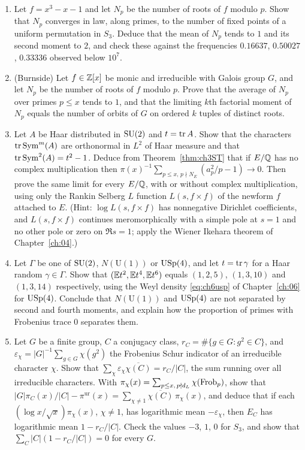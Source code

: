 \begin{enumerate}
\item Let $f=x^3-x-1$ and let $N_p$ be the number of roots of $f$ modulo $p$. Show that $N_p$ converges in law, along primes, to the number of fixed points of a uniform permutation in $S_3$. Deduce that the mean of $N_p$ tends to $1$ and its second moment to $2$, and check these against the frequencies $0.16637$, $0.50027$, $0.33336$ observed below $10^7$.
\item (Burnside) Let $f\in\mathbb{Z}[x]$ be monic and irreducible with Galois group $G$, and let $N_p$ be the number of roots of $f$ modulo $p$. Prove that the average of $N_p$ over primes $p\le x$ tends to $1$, and that the limiting $k$th factorial moment of $N_p$ equals the number of orbits of $G$ on ordered $k$ tuples of distinct roots.
\item Let $A$ be Haar distributed in $\mathrm{SU}(2)$ and $t=\operatorname{tr} A$. Show that the characters $\operatorname{tr}\operatorname{Sym}^m(A)$ are orthonormal in $L^2$ of Haar measure and that $\operatorname{tr}\operatorname{Sym}^2(A)=t^2-1$. Deduce from Theorem~\ref{thm:ch3ST} that if $E/\mathbb{Q}$ has no complex multiplication then $\pi(x)^{-1}\sum_{p\le x,\,p\nmid N_E}(a_p^2/p-1)\to0$. Then prove the same limit for every $E/\mathbb{Q}$, with or without complex multiplication, using only the Rankin Selberg $L$ function $L(s,f\times f)$ of the newform $f$ attached to $E$. (Hint: $\log L(s,f\times f)$ has nonnegative Dirichlet coefficients, and $L(s,f\times f)$ continues meromorphically with a simple pole at $s=1$ and no other pole or zero on $\Re s=1$; apply the Wiener Ikehara theorem of Chapter~\ref{ch:04}.)
\item Let $\Gamma$ be one of $\mathrm{SU}(2)$, $N(\mathrm{U}(1))$ or $\mathrm{USp}(4)$, and let $t=\operatorname{tr}\gamma$ for a Haar random $\gamma\in\Gamma$. Show that $(\mathbb{E} t^2,\mathbb{E} t^4,\mathbb{E} t^6)$ equals $(1,2,5)$, $(1,3,10)$ and $(1,3,14)$ respectively, using the Weyl density \eqref{eq:ch6usp} of Chapter~\ref{ch:06} for $\mathrm{USp}(4)$. Conclude that $N(\mathrm{U}(1))$ and $\mathrm{USp}(4)$ are not separated by second and fourth moments, and explain how the proportion of primes with Frobenius trace $0$ separates them.
\item\label{ex:ch3fs} Let $G$ be a finite group, $C$ a conjugacy class, $r_C=\#\{g\in G:g^2\in C\}$, and $\varepsilon_\chi=|G|^{-1}\sum_{g\in G}\chi(g^2)$ the Frobenius Schur indicator of an irreducible character $\chi$. Show that $\sum_\chi\varepsilon_\chi\overline{\chi(C)}=r_C/|C|$, the sum running over all irreducible characters. With $\pi_\chi(x)=\sum_{p\le x,\,p\nmid d_L}\chi(\operatorname{Frob}_p)$, show that $|G|\pi_C(x)/|C|-\pi^{\mathrm{ur}}(x)=\sum_{\chi\ne1}\overline{\chi(C)}\,\pi_\chi(x)$, and deduce that if each $(\log x/\sqrt x)\pi_\chi(x)$, $\chi\ne1$, has logarithmic mean $-\varepsilon_\chi$, then $E_C$ has logarithmic mean $1-r_C/|C|$. Check the values $-3$, $1$, $0$ for $S_3$, and show that $\sum_C|C|(1-r_C/|C|)=0$ for every $G$.

\end{enumerate}
